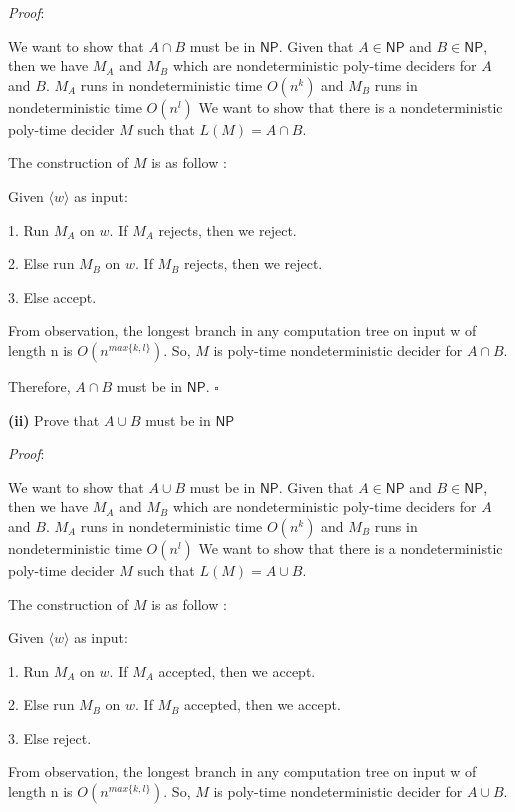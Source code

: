 \documentclass[a4paper, 11pt]{article}
\renewcommand{\part}[1] {\vspace{.10in} {\bf (#1)}}
\begin{document}
	{\em Proof}: 
	
	We want to show that $A \cap B$ must be in $\textsf{NP}$. Given that $A \in \textsf{NP} $ and $B \in \textsf{NP}$, then we have $M_A$ and $M_B$ which are nondeterministic poly-time deciders for $A$ and $B$. $M_A$ runs in nondeterministic time $O(n^k)$ and $M_B$ runs in nondeterministic time $O(n^l)$ We want to show that there is a nondeterministic poly-time decider $M$ such that $L(M) = A \cap B$. 
	
	The construction of $M$ is as follow :
	
	Given $\langle w \rangle$ as input:
	
	1. Run $M_A$ on $w$. If $M_A$ rejects, then we reject.
	
	2. Else run $M_B$ on $w$. If $M_B$ rejects, then we reject.
	
	3. Else accept.
	
	From observation, the longest branch in any computation tree on input w of length n is $O(n^{max\{k,l\}})$. So, $M$ is poly-time nondeterministic decider for $A \cap B$.
	
	Therefore, $A \cap B$ must be in $\textsf{NP}$.
	 $\square$
	
	\part{ii} Prove that $A \cup B$ must be in $\textsf{NP}$
	
	{\em Proof}: 
	
	We want to show that $A \cup B$ must be in $\textsf{NP}$. Given that $A \in \textsf{NP} $ and $B \in \textsf{NP}$, then we have $M_A$ and $M_B$ which are nondeterministic poly-time deciders for $A$ and $B$. $M_A$ runs in nondeterministic time $O(n^k)$ and $M_B$ runs in nondeterministic time $O(n^l)$ We want to show that there is a nondeterministic poly-time decider $M$ such that $L(M) = A \cup B$. 
	
	The construction of $M$ is as follow :
	
	Given $\langle w \rangle$ as input:
	
	1. Run $M_A$ on $w$. If $M_A$ accepted, then we accept.
	
	2. Else run $M_B$ on $w$. If $M_B$ accepted, then we accept.
	
	3. Else reject.
	
	From observation, the longest branch in any computation tree on input w of length n is $O(n^{max\{k,l\}})$. So, $M$ is poly-time nondeterministic decider for $A \cup B$.
	
\end{document}
